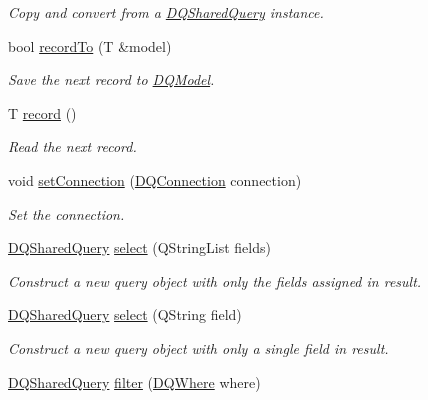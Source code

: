 \begin{DoxyCompactItemize}
\begin{DoxyCompactList}\small\item\em Copy and convert from a \hyperlink{classDQSharedQuery}{DQSharedQuery} instance. \item\end{DoxyCompactList}\item 
\hypertarget{classDQQuery_a167838122e9c4ba9e78618df9f5f2697}{
bool \hyperlink{classDQQuery_a167838122e9c4ba9e78618df9f5f2697}{recordTo} (T \&model)}
\label{classDQQuery_a167838122e9c4ba9e78618df9f5f2697}

\begin{DoxyCompactList}\small\item\em Save the next record to \hyperlink{classDQModel}{DQModel}. \item\end{DoxyCompactList}\item 
\hypertarget{classDQQuery_a40daff202edfbe3ef34b63bff71436f3}{
T \hyperlink{classDQQuery_a40daff202edfbe3ef34b63bff71436f3}{record} ()}
\label{classDQQuery_a40daff202edfbe3ef34b63bff71436f3}

\begin{DoxyCompactList}\small\item\em Read the next record. \item\end{DoxyCompactList}\item 
\hypertarget{classDQSharedQuery_a3f59e7684a41586b3bd1b06fc847b024}{
void \hyperlink{classDQSharedQuery_a3f59e7684a41586b3bd1b06fc847b024}{setConnection} (\hyperlink{classDQConnection}{DQConnection} connection)}
\label{classDQSharedQuery_a3f59e7684a41586b3bd1b06fc847b024}

\begin{DoxyCompactList}\small\item\em Set the connection. \item\end{DoxyCompactList}\item 
\hyperlink{classDQSharedQuery}{DQSharedQuery} \hyperlink{classDQSharedQuery_a60a2efb0904f71a2b65adc780fe86079}{select} (QStringList fields)
\begin{DoxyCompactList}\small\item\em Construct a new query object with only the fields assigned in result. \item\end{DoxyCompactList}\item 
\hyperlink{classDQSharedQuery}{DQSharedQuery} \hyperlink{classDQSharedQuery_a358915a000eb6fe7e1e7f1d32c0f34b8}{select} (QString field)
\begin{DoxyCompactList}\small\item\em Construct a new query object with only a single field in result. \item\end{DoxyCompactList}\item 
\hypertarget{classDQSharedQuery_ac2cfe9a2d996d9b5cf6ce4c8726dc233}{
\hyperlink{classDQSharedQuery}{DQSharedQuery} \hyperlink{classDQSharedQuery_ac2cfe9a2d996d9b5cf6ce4c8726dc233}{filter} (\hyperlink{classDQWhere}{DQWhere} where)}
\label{classDQSharedQuery_ac2cfe9a2d996d9b5cf6ce4c8726dc233}


\end{DoxyCompactItemize}
